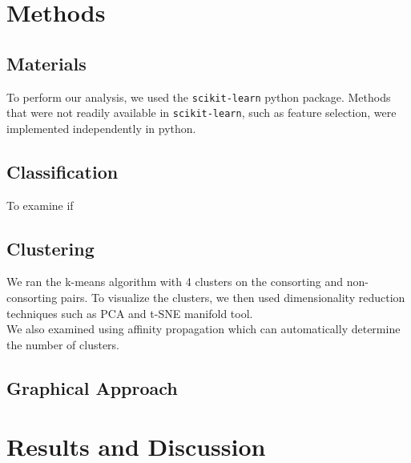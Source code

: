 \documentclass[twoside,twocolumn,paper=letter]{article}
\begin{document}
\section{Methods}
\subsection{Materials}

To perform our analysis, we used the \texttt{scikit-learn} python package. Methods
that were not readily available in \texttt{scikit-learn}, such as feature selection, were
implemented independently in python.


\subsection{Classification}
To examine if 
\subsection{Clustering}

We ran the k-means algorithm with 4 clusters on the consorting and
non-consorting pairs. To visualize the clusters, we then used dimensionality
reduction techniques such as PCA and t-SNE manifold tool.\\

We also examined using affinity propagation which can automatically determine
the number of clusters.

\subsection{Graphical Approach}


\section{Results and Discussion}
\end{document}

